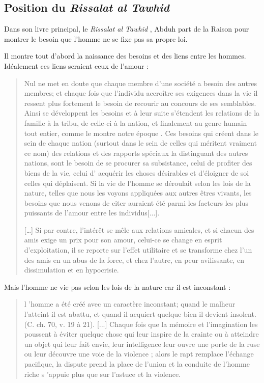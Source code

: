 \subsection{Position du \emph{Rissalat al Tawhid}}
Dans son livre principal, le \emph{Rissalat al Tawhid} {\citep{Abdou:Rissalat}}, Abduh part de la Raison pour montrer le besoin que l'homme ne se fixe pas sa propre loi.

Il montre tout d'abord la naissance des besoins et des liens entre les hommes. Idéalement ces liens seraient ceux de l'amour : 
\begin{quote}
    Nul ne met en doute que chaque membre d'une société a besoin
des autres membres; et chaque fois que l'individu accroître ses exigences
dans la vie il ressent plus fortement le besoin de recourir au concours
de ses semblables. Ainsi se développent les besoins et à leur suite s'étendent
les relations de la famille à la tribu, de celle-ci à la nation, et finalement
au genre humain tout entier, comme le montre notre époque . Ces
besoins qui créent dans le sein de chaque nation (surtout dans le sein de
celles qui méritent vraiment ce nom) des relations et des rapports
spéciaux la distinguant des autres nations, sont le besoin de se procurer
sa subsistance, celui de profiter des biens de la vie, celui d' acquérir
les choses désirables et d'éloigner de soi celles qui déplaisent. 
Si la vie de l'homme se déroulait selon les lois de la nature, telles
que nous les voyons appliquées aux autres êtres vivants, les besoins
que nous venons de citer auraient été parmi les facteurs les plus puissants
de l'amour entre les individus[...].  

[\ldots]
Si par contre, l'intérêt se mêle aux relations amicales, et si chacun des amis exige un prix pour son amour, celui-ce se change en esprit d'exploitation, il se reporte sur l'effet utilitaire et se transforme chez l'un des amis en un abus de la force, et chez l'autre, en peur avilissante, en dissimulation et en hypocrisie.
\end{quote}
Mais l'homme ne vie pas selon les lois de la nature car il est inconstant : 
\begin{quote}
 l 'homme
a été créé avec un caractère inconstant; quand le malheur l'atteint
il est abattu, et quand il acquiert quelque bien il devient insolent.
(C. ch. 70, v. 19 à 21). [...]
Chaque fois que la mémoire et l'imagination les poussent à
éviter quelque chose qui leur inspire de la crainte ou à atteindre un
objet qui leur fait envie, leur intelligence leur ouvre une porte de la
ruse ou leur découvre une voie de la violence ; alors le rapt remplace
l'échange pacifique, la dispute prend la place de l'union et la conduite
de l'homme riche s 'appuie plus que sur l'astuce et la violence.
\end{quote}
